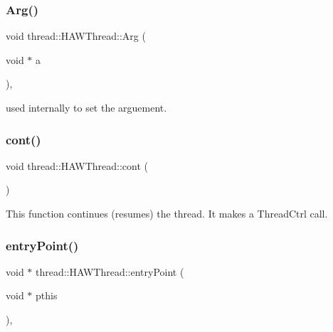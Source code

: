 \subsubsection{\texorpdfstring{Arg()}{Arg()}\hspace{0.1cm}{\footnotesize\ttfamily [2/2]}}
{\footnotesize\ttfamily void thread\+::\+H\+A\+W\+Thread\+::\+Arg (\begin{DoxyParamCaption}\item[{void $\ast$}]{a }\end{DoxyParamCaption})\hspace{0.3cm}{\ttfamily [inline]}, {\ttfamily [protected]}}

used internally to set the arguement. \hypertarget{classthread_1_1_h_a_w_thread_a4c480261e3236c90c8de73be55650ba4}{}\label{classthread_1_1_h_a_w_thread_a4c480261e3236c90c8de73be55650ba4} 
\subsubsection{\texorpdfstring{cont()}{cont()}}
{\footnotesize\ttfamily void thread\+::\+H\+A\+W\+Thread\+::cont (\begin{DoxyParamCaption}{ }\end{DoxyParamCaption})}

This function continues (resumes) the thread. It makes a Thread\+Ctrl call. \hypertarget{classthread_1_1_h_a_w_thread_a044da2e1a8884a3e2764f9f1863863c7}{}\label{classthread_1_1_h_a_w_thread_a044da2e1a8884a3e2764f9f1863863c7} 
\subsubsection{\texorpdfstring{entry\+Point()}{entryPoint()}}
{\footnotesize\ttfamily void $\ast$ thread\+::\+H\+A\+W\+Thread\+::entry\+Point (\begin{DoxyParamCaption}\item[{void $\ast$}]{pthis }\end{DoxyParamCaption})\hspace{0.3cm}{\ttfamily [static]}, {\ttfamily [protected]}}

\hypertarget{classthread_1_1_h_a_w_thread_ae565cb73c096b246664bd2474b9c8907}{}\label{classthread_1_1_h_a_w_thread_ae565cb73c096b246664bd2474b9c8907} 
